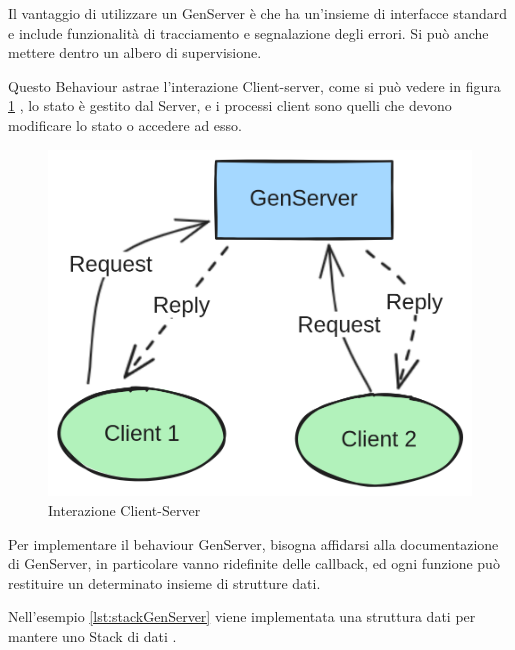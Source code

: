 Il vantaggio di utilizzare un GenServer è che ha un'insieme
di interfacce standard e include funzionalità di tracciamento
e segnalazione degli errori. Si può anche mettere dentro un
albero di supervisione.

Questo Behaviour astrae l'interazione Client-server, come si può vedere
in figura \ref{fig:client_server}  \cite{GenServe6:online},
lo stato è gestito dal Server, e i processi client sono quelli che
devono modificare lo stato o accedere ad esso.

\begin{figure}[!htp]
    \centering
    \includegraphics[keepaspectratio=true,scale=0.20]{images/GenServer.png}
	\caption{Interazione Client-Server}
  	\label{fig:client_server}
\end{figure}

Per implementare il behaviour GenServer, bisogna affidarsi alla
documentazione di GenServer, in particolare vanno ridefinite delle
callback, ed ogni funzione può restituire un determinato insieme di
strutture dati.

Nell'esempio \ref{lst:stackGenServer} viene implementata una struttura dati
per mantere uno Stack di dati \cite{GenServe6:online}.

